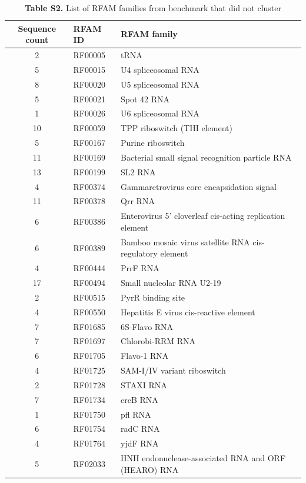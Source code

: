 \documentclass{bmcart}
\begin{document}
\begin{table}
\centering
\caption*{\textbf{Table S2.}  List of RFAM families from benchmark that did not cluster}
\begin{tabular}{cll}
\hline
Sequence count & RFAM ID & RFAM family \\
\hline
2 & RF00005 &  tRNA \\
5 & RF00015 &  U4 spliceosomal RNA \\
8 & RF00020 &  U5 spliceosomal RNA \\
5 & RF00021 &  Spot 42 RNA \\
1 & RF00026 &  U6 spliceosomal RNA \\
10 & RF00059 &  TPP riboswitch (THI element) \\
5 & RF00167 &  Purine riboswitch \\
11 & RF00169 &  Bacterial small signal recognition particle RNA \\
13 & RF00199 &  SL2 RNA \\
4 & RF00374 &  Gammaretrovirus core encapsidation signal \\
11 & RF00378 &  Qrr RNA \\
6 & RF00386 &  Enterovirus 5' cloverleaf cis-acting replication element \\
6 & RF00389 &  Bamboo mosaic virus satellite RNA cis-regulatory element \\
4 & RF00444 &  PrrF RNA \\
17 & RF00494 &  Small nucleolar RNA U2-19 \\
2 & RF00515 &  PyrR binding site \\
4 & RF00550 &  Hepatitis E virus cis-reactive element \\
7 & RF01685 &  6S-Flavo RNA \\
7 & RF01697 &  Chlorobi-RRM RNA \\
6 & RF01705 &  Flavo-1 RNA \\
4 & RF01725 &  SAM-I/IV variant riboswitch \\
2 & RF01728 &  STAXI RNA \\
7 & RF01734 &  crcB RNA \\
1 & RF01750 &  pfl RNA \\
6 & RF01754 &  radC RNA \\
4 & RF01764 &  yjdF RNA \\
5 & RF02033 &  HNH endonuclease-associated RNA and ORF (HEARO) RNA \\
\hline
\end{tabular}
\end{table}
\end{document}

